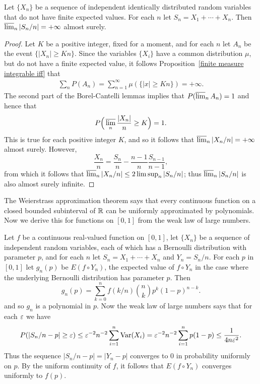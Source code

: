 \begin{theorem}
Let $\{X_n\}$ be a sequence of independent identically distributed random variables that do not have finite expected values. For each $n$ let $S_n=X_1+\cdots+X_n$. Then $\varlimsup_n|S_n/n|=+\infty$ almost surely.
\end{theorem}
\begin{proof}
Let $K$ be a positive integer, fixed for a moment, and for each $n$ let $A_n$ be the event $\{|X_n|\geq Kn\}$. Since the variables $\{X_i\}$ have a common distribution $\mu$, but do not have a finite expected value, it follows Proposition~\ref{finite measure integrable iff} that
\begin{align*}
\sum_nP(A_n)=\sum_{n=1}^{\infty}\mu(\{|x|\geq Kn\})=+\infty.
\end{align*}
The second part of the Borel-Cantelli lemmas implies that $P(\varlimsup_nA_n)=1$ and hence that
\[P\Big(\varlimsup_n\frac{|X_n|}{n}\geq K\Big)=1.\]
This is true for each positive integer $K$, and so it follows that $\varlimsup_n|X_n/n|=+\infty$ almost surely. However,
\[\frac{X_n}{n}=\frac{S_n}{n}-\frac{n-1}{n}\frac{S_{n-1}}{n-1},\]
from which it follows that $\varlimsup_n|X_n/n|\leq 2\limsup_n|S_n/n|$; thus $\varlimsup_n|S_n/n|$ is also almost surely infinite.
\end{proof}
\begin{example}
The Weierstrass approximation theorem says that every continuous function on a closed bounded subinterval of $\mathbb{R}$ can be uniformly approximated by polynomials. Now we derive this for functions on $[0,1]$ from the weak law of large numbers.\par
Let $f$ be a continuous real-valued function on $[0,1]$, let $\{X_n\}$ be a sequence of independent random variables, each of which has a Bernoulli distribution with parameter $p$, and for each $n$ let $S_n=X_1+\cdots+X_n$ and $Y_n=S_n/n$. For each $p$ in $[0,1]$ let $g_n(p)$ be $E(f\circ Y_n)$, the expected value of $f\circ Y_n$ in the case where the underlying Bernoulli distribution has parameter $p$. Then
\[g_n(p)=\sum_{k=0}^{n}f(k/n)\binom{n}{k}p^k(1-p)^{n-k}.\]
and so $g_n$ is a polynomial in $p$. Now the weak law of large numbers says that for each $\varepsilon$ we have
\[P(|S_n/n-p|\geq\varepsilon)\leq\varepsilon^{-2}n^{-2}\sum_{i=1}^{n}\mathrm{Var}(X_i)=\varepsilon^{-2}n^{-2}\sum_{i=1}^{n}p(1-p)\leq\frac{1}{4n\varepsilon^2}.\]
Thus the sequence $|S_n/n-p|=|Y_n-p|$ converges to $0$ in probability uniformly on $p$. By the uniform continuity of $f$, it follows that $E(f\circ Y_n)$ converges uniformly to $f(p)$.
\end{example}
